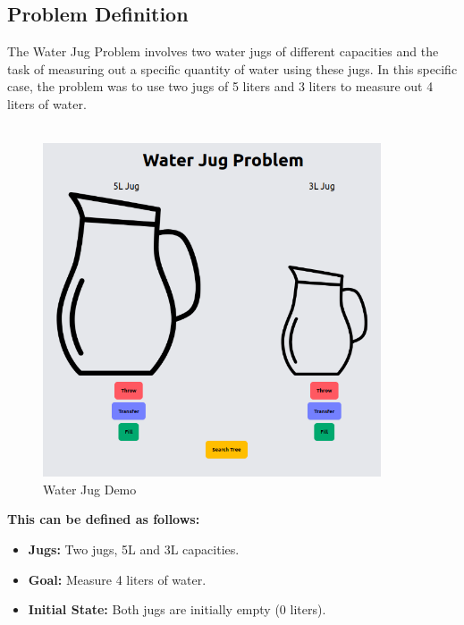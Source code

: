 \documentclass[12pt]{article}
\begin{document}
\subsection{Problem Definition}
The Water Jug Problem involves two water jugs of different capacities and the task of measuring out a specific quantity of water using these jugs. In this specific case, the problem was to use two jugs of 5 liters and 3 liters to measure out 4 liters of water.
\\\\
\begin{figure}[h]
  \centerline{\includegraphics[width = 100mm]{WaterJug_demo.png}}
  \caption{Water Jug Demo}
  \label{fig}
\end{figure}

\textbf{This can be defined as follows:}

\begin{itemize}
    \item \textbf{Jugs:} Two jugs, 5L and 3L capacities.
    \item \textbf{Goal:} Measure 4 liters of water.
    \item \textbf{Initial State:} Both jugs are initially empty (0 liters).
\end{itemize}
\end{document}

